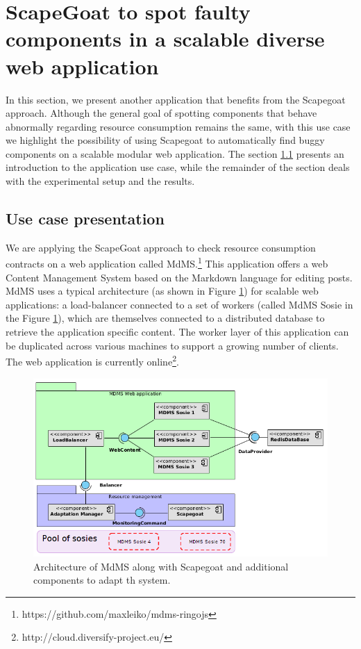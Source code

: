 \section{ScapeGoat to spot faulty components in a scalable diverse web application}\label{sec:WebStudy}
In this section, we present another application that benefits from the Scapegoat approach.
Although the general goal of spotting components that behave abnormally regarding resource consumption remains the same, with this use case we highlight the possibility of using Scapegoat 
to automatically find buggy components on a scalable modular web application.
The section \ref{MdMS} presents an introduction to the application use case, while the remainder of the section deals with the experimental setup and the results.


\subsection{Use case presentation}\label{MdMS}
We are applying the ScapeGoat approach to check resource consumption contracts on a web application called MdMS.\footnote{https://github.com/maxleiko/mdms-ringojs}
This application offers a web Content Management System based on the Markdown language for editing posts. 
MdMS uses a typical architecture (as shown in Figure \ref{fig:webapp}) for scalable web applications: a load-balancer connected to a set of workers (called MdMS Sosie in the Figure \ref{fig:webapp}), which are themselves connected to a distributed database to retrieve the application specific content.
The worker layer of this application can be duplicated across various machines to support a growing number of clients.
The web application is currently online\footnote{http://cloud.diversify-project.eu/}. 

\begin{figure}[!bt]
	\centering
	\includegraphics[scale=0.45]{./chapter5/figures/webapp2}
	\caption{\label{fig:webapp}Architecture of MdMS along with Scapegoat and additional components to adapt th system.}
\end{figure}

